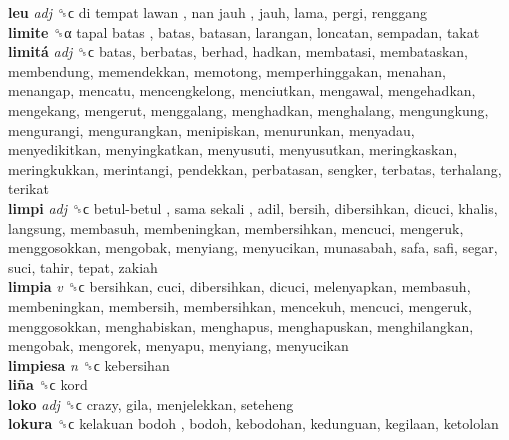 \textbf{leu} \emph{adj}  ␝ϲ   di tempat lawan ,  nan jauh , jauh, lama, pergi, renggang  \\
\textbf{limite} ␝α   tapal batas , batas, batasan, larangan, loncatan, sempadan, takat  \\
\textbf{limitá} \emph{adj}  ␝ϲ  batas, berbatas, berhad, hadkan, membatasi, membataskan, membendung, memendekkan, memotong, memperhinggakan, menahan, menangap, mencatu, mencengkelong, menciutkan, mengawal, mengehadkan, mengekang, mengerut, menggalang, menghadkan, menghalang, mengungkung, mengurangi, mengurangkan, menipiskan, menurunkan, menyadau, menyedikitkan, menyingkatkan, menyusuti, menyusutkan, meringkaskan, meringkukkan, merintangi, pendekkan, perbatasan, sengker, terbatas, terhalang, terikat  \\
\textbf{limpi} \emph{adj}  ␝ϲ   betul-betul ,  sama sekali , adil, bersih, dibersihkan, dicuci, khalis, langsung, membasuh, membeningkan, membersihkan, mencuci, mengeruk, menggosokkan, mengobak, menyiang, menyucikan, munasabah, safa, safi, segar, suci, tahir, tepat, zakiah  \\
\textbf{limpia} \emph{v}  ␝ϲ  bersihkan, cuci, dibersihkan, dicuci, melenyapkan, membasuh, membeningkan, membersih, membersihkan, mencekuh, mencuci, mengeruk, menggosokkan, menghabiskan, menghapus, menghapuskan, menghilangkan, mengobak, mengorek, menyapu, menyiang, menyucikan  \\
\textbf{limpiesa} \emph{n}  ␝ϲ  kebersihan  \\
\textbf{liña} ␝ϲ  kord  \\
\textbf{loko} \emph{adj}  ␝ϲ  crazy, gila, menjelekkan, seteheng  \\
\textbf{lokura} ␝ϲ   kelakuan bodoh , bodoh, kebodohan, kedunguan, kegilaan, ketololan  \\
